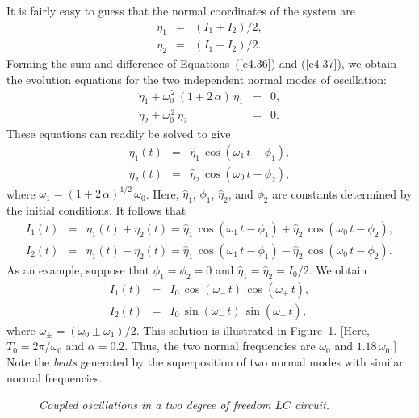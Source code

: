 {It is fairly easy to guess that the normal coordinates of the system are
\begin{eqnarray}
\eta_1 &=&(I_1+I_2)/2,\\[0.5ex]
\eta_2&=&(I_1-I_2)/2.
\end{eqnarray}
Forming the sum and difference of Equations~(\ref{e4.36})
and (\ref{e4.37}), we obtain the evolution equations for the two
independent normal modes of oscillation:
\begin{eqnarray}
\ddot{\eta}_1+\omega_0^{\,2}\,(1+2\,\alpha)\,\eta_1 &=&0,\\[0.5ex]
\ddot{\eta}_2+\omega_0^{\,2}\,\eta_2 &=&0.
\end{eqnarray}
These equations can readily  be solved to give
\begin{eqnarray}
\eta_1(t)&=&\hat{\eta}_1\,\cos(\omega_1\,t-\phi_1),\\[0.5ex]
\eta_2(t)&=&\hat{\eta}_2\,\cos(\omega_0\,t-\phi_2),
\end{eqnarray}
where $\omega_1=(1+2\,\alpha)^{1/2}\,\omega_0$. Here, $\hat{\eta}_1$, $\phi_1$, $\hat{\eta}_2$, and $\phi_2$ are 
constants determined by the initial conditions. 
It follows that 
\begin{eqnarray}\label{e4.44}
I_1(t)&=&\eta_1(t)+\eta_2(t) = \hat{\eta}_1\,\cos(\omega_1\,t-\phi_1)+\hat{\eta}_2\,\cos(\omega_0\,t-\phi_2),\\[0.5ex]
I_2(t) &=& \eta_1(t)-\eta_2(t) = \hat{\eta}_1\,\cos(\omega_1\,t-\phi_1)-\hat{\eta}_2\,\cos(\omega_0\,t-\phi_2).\label{e4.45}
\end{eqnarray}
As an example, suppose that $\phi_1=\phi_2=0$ and $\hat{\eta}_1=\hat{\eta}_2= I_0/2$. 
We obtain
\begin{eqnarray}
I_1(t) &=& I_0\,\cos(\omega_-\,t)\,\cos(\omega_+\,t),\\[0.5ex]
I_2(t) &=& I_0\,\sin (\omega_-\,t)\,\sin(\omega_+\,t),
\end{eqnarray}
where $\omega_\pm = (\omega_0\pm \omega_1)/2$. This solution is illustrated
in Figure~\ref{f4.4}. [Here, $T_0=2\pi/\omega_0$ and $\alpha=0.2$.
Thus, the two normal frequencies are $\omega_0$ and $1.18\,\omega_0$.] Note the
{\em beats}\/ generated by the superposition of two normal modes with similar
normal frequencies. 

\begin{figure}
\epsfysize=2.2in
\centerline{}
\caption{\em Coupled oscillations in a two degree of freedom  $LC$ circuit.}\label{f4.4}   
\end{figure}

}
